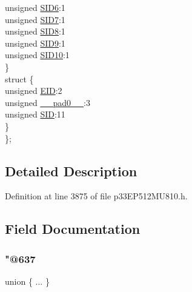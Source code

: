 \begin{DoxyCompactItemize}
\begin{tabbing}
\>\>unsigned \hyperlink{structtag_c1_r_x_f3_s_i_d_b_i_t_s_a70d70952133eb2389d5c326f9f0e8035}{SID6}:1\\
\>\>unsigned \hyperlink{structtag_c1_r_x_f3_s_i_d_b_i_t_s_a34097fb76decd431701fa2d86a22328e}{SID7}:1\\
\>\>unsigned \hyperlink{structtag_c1_r_x_f3_s_i_d_b_i_t_s_afe74894633244fdb0b0c01b4e8c522e7}{SID8}:1\\
\>\>unsigned \hyperlink{structtag_c1_r_x_f3_s_i_d_b_i_t_s_a33587704948067005c2a6a3ccc503c99}{SID9}:1\\
\>\>unsigned \hyperlink{structtag_c1_r_x_f3_s_i_d_b_i_t_s_a1a9084031c7f5fb16007feeebf0d8216}{SID10}:1\\
\>\} \\
\>struct \{\\
\>\>unsigned \hyperlink{structtag_c1_r_x_f3_s_i_d_b_i_t_s_ae80b378c9141f7c03e0b4e55b5f4b54d}{EID}:2\\
\>\>unsigned \hyperlink{structtag_c1_r_x_f3_s_i_d_b_i_t_s_adf71f3d8410c1f1dbbc96680a92c49af}{\_\_pad0\_\_}:3\\
\>\>unsigned \hyperlink{structtag_c1_r_x_f3_s_i_d_b_i_t_s_af88edf93b2fee2432665bd84f51287e4}{SID}:11\\
\>\} \\
\}; \\

\end{tabbing}\end{DoxyCompactItemize}


\subsection{Detailed Description}


Definition at line 3875 of file p33\+E\+P512\+M\+U810.\+h.



\subsection{Field Documentation}
\mbox{\label{structtag_c1_r_x_f3_s_i_d_b_i_t_s_aae56e54d330a819443bc0cb778bdd6ac}} 
\subsubsection{\texorpdfstring{"@637}{@637}}
{\footnotesize\ttfamily union \{ ... \} }

\mbox{\label{structtag_c1_r_x_f3_s_i_d_b_i_t_s_adf71f3d8410c1f1dbbc96680a92c49af}} 
